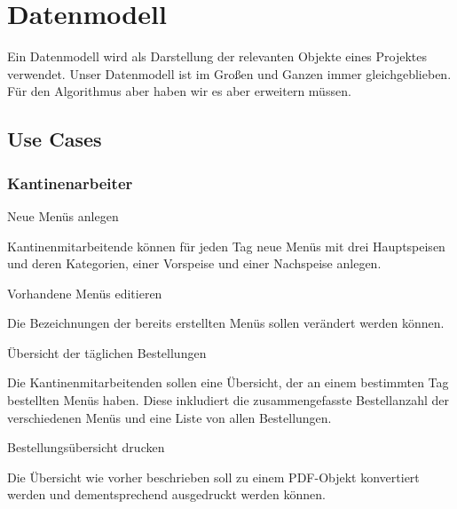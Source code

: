 \section{Datenmodell}
\author{David Ignjatovic}

Ein Datenmodell wird als Darstellung der relevanten Objekte eines Projektes verwendet. 
Unser Datenmodell ist im Großen und Ganzen immer gleichgeblieben. Für den Algorithmus aber haben wir es aber erweitern müssen.

\subsection{Use Cases}

\subsubsection{Kantinenarbeiter}

\begin{compactitem}
    \item Neue Menüs anlegen
    \begin{compactitem}
        \item Kantinenmitarbeitende können für jeden Tag neue Menüs mit drei Hauptspeisen und deren Kategorien, einer Vorspeise und einer Nachspeise anlegen.
    \end{compactitem}
    \item Vorhandene Menüs editieren
    \begin{compactitem}
        \item Die Bezeichnungen der bereits erstellten Menüs sollen verändert werden können.
    \end{compactitem}
    \item Übersicht der täglichen Bestellungen
    \begin{compactitem}
        \item Die Kantinenmitarbeitenden sollen eine Übersicht, der an einem bestimmten Tag bestellten Menüs haben. Diese inkludiert die zusammengefasste Bestellanzahl der verschiedenen Menüs und eine Liste von allen Bestellungen.
    \end{compactitem}
    \item Bestellungsübersicht drucken
    \begin{compactitem}
        \item Die Übersicht wie vorher beschrieben soll zu einem PDF-Objekt konvertiert werden und dementsprechend ausgedruckt werden können.
    \end{compactitem}
\end{compactitem}

